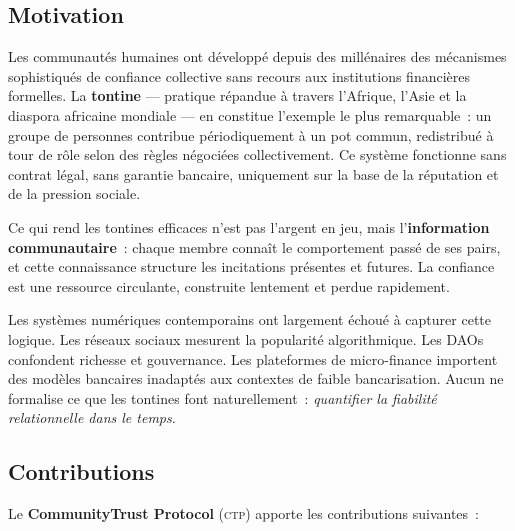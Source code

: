 \documentclass[12pt,a4paper]{article}
\theoremstyle{definition}
\theoremstyle{plain}
\theoremstyle{remark}
\newcommand{\CTP}{\textsc{ctp}}
\newcommand{\1}{\mathbf{1}}
\begin{document}
\subsection{Motivation}

Les communautés humaines ont développé depuis des millénaires des mécanismes
sophistiqués de confiance collective sans recours aux institutions financières
formelles. La \textbf{tontine} --- pratique répandue à travers l'Afrique,
l'Asie et la diaspora africaine mondiale --- en constitue l'exemple le plus
remarquable~: un groupe de personnes contribue périodiquement à un pot commun,
redistribué à tour de rôle selon des règles négociées collectivement. Ce
système fonctionne sans contrat légal, sans garantie bancaire, uniquement sur
la base de la réputation et de la pression sociale.

Ce qui rend les tontines efficaces n'est pas l'argent en jeu, mais
l'\textbf{information communautaire}~: chaque membre connaît le comportement
passé de ses pairs, et cette connaissance structure les incitations présentes
et futures. La confiance est une ressource circulante, construite lentement et
perdue rapidement.

Les systèmes numériques contemporains ont largement échoué à capturer cette
logique. Les réseaux sociaux mesurent la popularité algorithmique. Les DAOs
confondent richesse et gouvernance. Les plateformes de micro-finance importent
des modèles bancaires inadaptés aux contextes de faible bancarisation. Aucun
ne formalise ce que les tontines font naturellement~: \emph{quantifier la
fiabilité relationnelle dans le temps}.

\subsection{Contributions}

Le \textbf{CommunityTrust Protocol} (\CTP{}) apporte les contributions
suivantes~:
\end{document}
